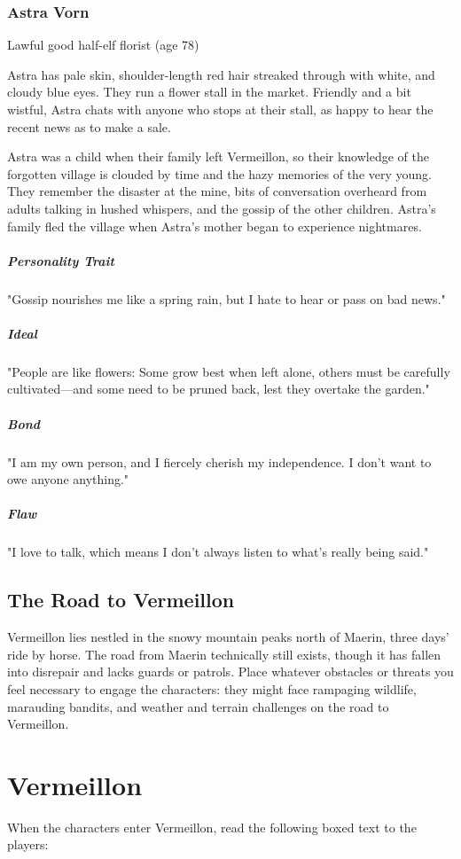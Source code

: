 \documentclass[10pt,a4paper,twoside,bg=print,twocolumn,openany,nodeprecatedcode]{dndbook}
\begin{document}
\subsubsection{Astra Vorn}
Lawful good half-elf florist (age 78)

Astra has pale skin, shoulder-length red hair streaked through with white, and cloudy blue eyes. They run a flower stall in the market. Friendly and a bit wistful, Astra chats with anyone who stops at their stall, as happy to hear the recent news as to make a sale.

Astra was a child when their family left Vermeillon, so their knowledge of the forgotten village is clouded by time and the hazy memories of the very young. They remember the disaster at the mine, bits of conversation overheard from adults talking in hushed whispers, and the gossip of the other children. Astra's family fled the village when Astra's mother began to experience nightmares.

\subparagraph{Personality Trait}
"Gossip nourishes me like a spring rain, but I hate to hear or pass on bad news."

\subparagraph{Ideal}
"People are like flowers: Some grow best when left alone, others must be carefully cultivated—and some need to be pruned back, lest they overtake the garden."

\subparagraph{Bond}
"I am my own person, and I fiercely cherish my independence. I don't want to owe anyone anything."

\subparagraph{Flaw}
"I love to talk, which means I don't always listen to what's really being said."

\subsection{The Road to Vermeillon}
Vermeillon lies nestled in the snowy mountain peaks north of Maerin, three days' ride by horse. The road from Maerin technically still exists, though it has fallen into disrepair and lacks guards or patrols. Place whatever obstacles or threats you feel necessary to engage the characters: they might face rampaging wildlife, marauding bandits, and weather and terrain challenges on the road to Vermeillon.

\section{Vermeillon}
When the characters enter Vermeillon, read the following boxed text to the players:
\end{document}
